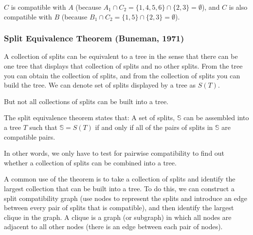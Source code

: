 \documentclass[11pt]{article}
\begin{document}
$C$ is compatible with $A$ (because $A_1 \cap C_2 = \{1,4,5,6\} \cap \{2,3\} = \emptyset$), and $C$ is also compatible with $B$ (because $B_1 \cap C_2 = \{1,5\} \cap \{2,3\} = \emptyset$).

\subsubsection*{Split Equivalence Theorem (Buneman, 1971)}
A collection of splits can be equivalent to a tree in the sense that there can be one tree that displays that collection of splits and no other splits.  
From the tree you can obtain the collection of splits, and from the collection of splits you can build the tree.
We can denote set of splits displayed by a tree as $S(T)$.

But not all collections of splits can be built into a tree.

The split equivalence theorem states that: A set of splits, $\mathbb S$ can be assembled into a tree $T$ such that $\mathbb S = S(T)$ if and only if all of the pairs of splits in $\mathbb S$ are compatible pairs.


In other words, we only have to test for pairwise compatibility to find out whether a collection of splits can be combined into a tree.

A common use of the theorem is to take a collection of splits and identify the largest collection that can be built into a tree. To do this, we can construct a split compatibility graph (use nodes to represent the splits and introduce an edge between every pair of splits that is compatible), and then identify the largest clique in the graph. 
A clique is a graph (or subgraph) in which all nodes are adjacent to all other nodes (there is an edge between each pair of nodes).


 
\end{document}
